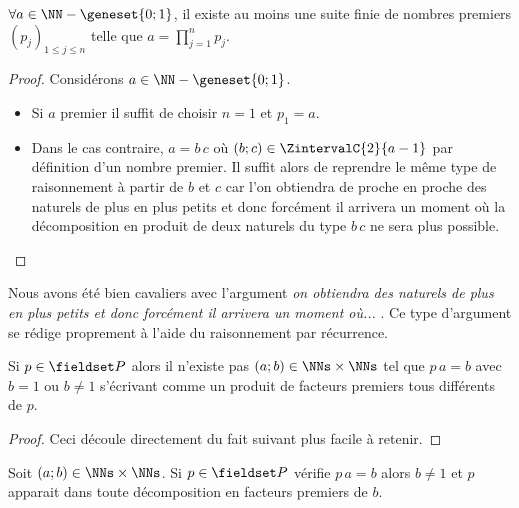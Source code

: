 \begin{fact} \label{exists-decompo}
	$\forall a \in \NN - \geneset{0 ; 1}$, il existe au moins une suite finie de nombres premiers $(p_j)_{1 \leq j \leq n}$
	telle que $\displaystyle a = \prod_{j=1}^{n} p_j$. 
\end{fact}

\begin{proof}
	Considérons $a \in \NN - \geneset{0 ; 1}$.
	
	\begin{itemize}[label=\small\textbullet]
		\item Si $a$ premier il suffit de choisir $n = 1$ et $p_1 = a$.
	
	
		\item Dans le cas contraire, $a = b \, c$ où $(b ; c) \in \ZintervalC{2}{a-1}$ par définition d'un nombre premier.
		Il suffit alors de reprendre le même type de raisonnement à partir de $b$ et $c$ car l'on obtiendra de proche en proche des naturels de plus en plus petits et donc forcément il arrivera un moment où la décomposition en produit de deux naturels du type $b \, c$ ne sera plus possible.
	\end{itemize}
\end{proof}


\begin{unproved}
	Nous avons été bien cavaliers avec l'argument \emph{\og on obtiendra des naturels de plus en plus petits et donc forcément il arrivera un moment où... \fg}. Ce type d'argument se rédige proprement à l'aide du raisonnement par récurrence.

\end{unproved}



\begin{fact} \label{pseudo-prime-divisor}
	Si $p \in \PP$ alors il n'existe pas $(a ; b) \in \NNs \times \NNs$ tel que
	$p \, a = b$ avec $b = 1$ ou $b \neq 1$ s'écrivant comme un produit de facteurs premiers tous différents de $p$.
\end{fact}
	

\begin{proof}
	Ceci découle directement du fait suivant plus facile à retenir.
\end{proof}



\begin{fact} \label{prime-divisor}
	Soit
	$(a ; b) \in \NNs \times \NNs$.
	Si $p \in \PP$ vérifie $p \, a = b$ alors $b \neq 1$ et $p$ apparait dans toute décomposition en facteurs premiers de $b$.
\end{fact}
	

